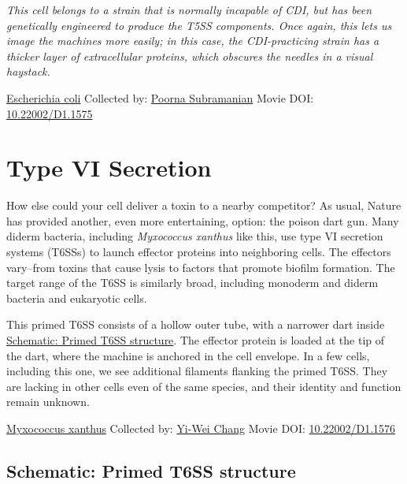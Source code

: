 \documentclass[]{tufte-book}
\begin{document}
\emph{This cell belongs to a strain that is normally incapable of CDI, but has been genetically engineered to produce the T5SS components. Once again, this lets us image the machines more easily; in this case, the CDI-practicing strain has a thicker layer of extracellular proteins, which obscures the needles in a visual haystack.}



\hypertarget{htmlwidget-4c5e0dce4bee956d85b1}{}

\label{fig:9-5}\protect\hyperlink{tree}{Escherichia coli} Collected by: \protect\hyperlink{poorna_subramanian}{Poorna Subramanian} Movie DOI: \href{https://doi.org/10.22002/D1.1575}{10.22002/D1.1575}

\hypertarget{type-vi-secretion}{%
\section{Type VI Secretion}\label{type-vi-secretion}}

How else could your cell deliver a toxin to a nearby competitor? As usual, Nature has provided another, even more entertaining, option: the poison dart gun. Many diderm bacteria, including \emph{Myxococcus xanthus} like this, use type VI secretion systems (T6SSs) to launch effector proteins into neighboring cells. The effectors vary--from toxins that cause lysis to factors that promote biofilm formation. The target range of the T6SS is similarly broad, including monoderm and diderm bacteria and eukaryotic cells.

This primed T6SS consists of a hollow outer tube, with a narrower dart inside \protect\hyperlink{Primed_T6SS_structure}{Schematic: Primed T6SS structure}. The effector protein is loaded at the tip of the dart, where the machine is anchored in the cell envelope. In a few cells, including this one, we see additional filaments flanking the primed T6SS. They are lacking in other cells even of the same species, and their identity and function remain unknown.



\hypertarget{htmlwidget-63ddf0ba158b9e535e0f}{}

\label{fig:9-6}\protect\hyperlink{tree}{Myxococcus xanthus} Collected by: \protect\hyperlink{yi-wei_chang}{Yi-Wei Chang} Movie DOI: \href{https://doi.org/10.22002/D1.1576}{10.22002/D1.1576}

\hypertarget{Primed_T6SS_structure}{%
\subsection*{Schematic: Primed T6SS structure}\label{Primed_T6SS_structure}}
\end{document}
